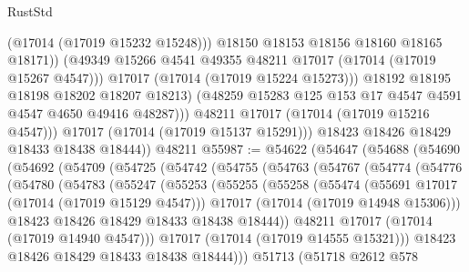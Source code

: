 \begin{lexlean}{RustStd}
\begin{coremodule}
                          (@17014 (@17019 @15232 @15248)))
                        @18150
                        @18153
                        @18156
                        @18160
                        @18165
                        @18171))
                    (@49349 @15266 @4541 @49355 @48211 @17017 (@17014 (@17019 @15267 @4547)))
                    @17017
                    (@17014 (@17019 @15224 @15273)))
                  @18192
                  @18195
                  @18198
                  @18202
                  @18207
                  @18213)
                (@48259 @15283 @125 @153 @17 @4547 @4591 @4547 @4650 @49416 @48287)))
            @48211
            @17017
            (@17014 (@17019 @15216 @4547)))
          @17017
          (@17014 (@17019 @15137 @15291)))
        @18423
        @18426
        @18429
        @18433
        @18438
        @18444))
    @48211
@55987 := @54622
    (@54647
      (@54688
        (@54690
          (@54692
            (@54709
              (@54725
                (@54742
                  (@54755
                    (@54763
                      (@54767
                        (@54774
                          (@54776
                            (@54780
                              (@54783
                                (@55247
                                  (@55253
                                    (@55255
                                      (@55258
                                        (@55474
                                          (@55691 @17017 (@17014 (@17019 @15129 @4547)))
                                          @17017
                                          (@17014 (@17019 @14948 @15306)))
                                        @18423
                                        @18426
                                        @18429
                                        @18433
                                        @18438
                                        @18444))
                                    @48211
                                    @17017
                                    (@17014 (@17019 @14940 @4547)))
                                  @17017
                                  (@17014 (@17019 @14555 @15321)))
                                @18423
                                @18426
                                @18429
                                @18433
                                @18438
                                @18444)))
                          @51713
                          (@51718
                            @2612
                            @578

\end{coremodule}
\end{lexlean}
